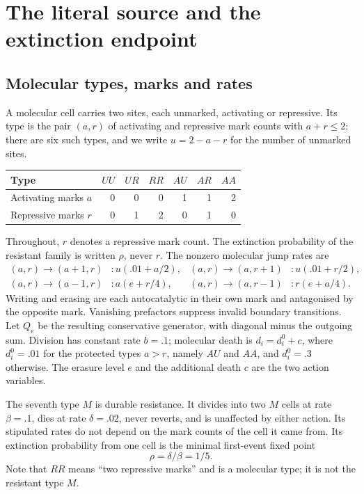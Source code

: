 \documentclass[11pt]{article}
\theoremstyle{remark}
\begin{document}
\section{The literal source and the extinction endpoint}\label{sec:source}

\subsection{Molecular types, marks and rates}
A molecular cell carries two sites, each unmarked, activating or repressive. Its
type is the pair $(a,r)$ of activating and repressive mark counts with
$a+r\le2$; there are six such types, and we write $u=2-a-r$ for the number of
unmarked sites.

\begin{center}
\begin{tabular}{lrrrrrr}\toprule
Type&$UU$&$UR$&$RR$&$AU$&$AR$&$AA$\\\midrule
Activating marks $a$&0&0&0&1&1&2\\
Repressive marks $r$&0&1&2&0&1&0\\\bottomrule
\end{tabular}
\end{center}

Throughout, $r$ denotes a repressive mark count. The extinction probability of
the resistant family is written $\rho$, never $r$. The nonzero molecular jump
rates are
\begin{align}
 (a,r)\to(a+1,r)&:u(.01+a/2),&
 (a,r)\to(a,r+1)&:u(.01+r/2),\label{eq:source}\\
 (a,r)\to(a-1,r)&:a(e+r/4),&
 (a,r)\to(a,r-1)&:r(e+a/4).\label{eq:source2}
\end{align}
Writing and erasing are each autocatalytic in their own mark and antagonised by
the opposite mark. Vanishing prefactors suppress invalid boundary transitions.
Let $Q_e$ be the resulting conservative generator, with diagonal minus the
outgoing sum. Division has constant rate $b=.1$; molecular death is
$d_i=d_i^0+c$, where $d_i^0=.01$ for the protected types $a>r$, namely $AU$ and
$AA$, and $d_i^0=.3$ otherwise. The erasure level $e$ and the additional death
$c$ are the two action variables.

The seventh type $M$ is durable resistance. It divides into two $M$ cells at rate
$\beta=.1$, dies at rate $\delta=.02$, never reverts, and is unaffected by either
action. Its stipulated rates do not depend on the mark counts of the cell it came
from. Its extinction probability from one cell is the minimal first-event fixed
point
\begin{equation}
 \rho=\delta/\beta=1/5.\label{eq:rho}
\end{equation}
Note that $RR$ means ``two repressive marks'' and is a molecular type; it is not
the resistant type $M$.
\end{document}
